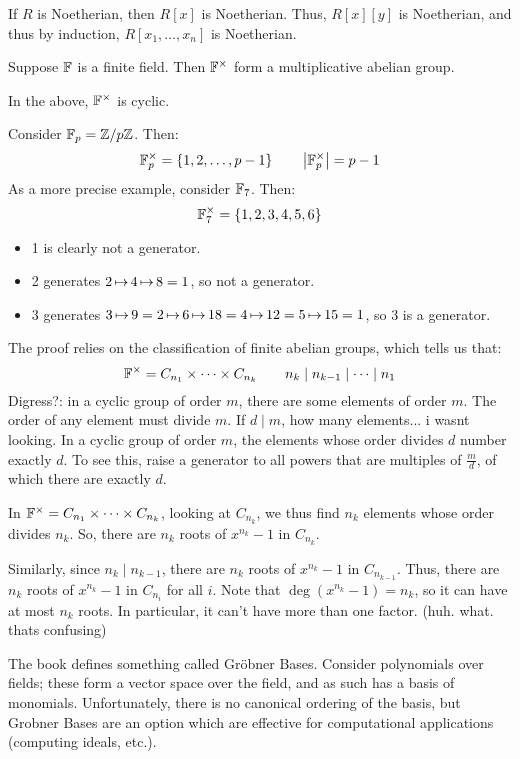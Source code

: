 If $ R $ is Noetherian, then $ R[x] $ is Noetherian.
Thus, $ R[x][y] $ is Noetherian, and thus by induction, $ R[x_{1},\dots,x_{n}] $ is Noetherian.

Suppose $ \mathbb{F} $ is a finite field. Then $ \mathbb{F}^{\times} $ form a multiplicative abelian group.
\begin{thm}
    In the above, $ \mathbb{F}^{\times} $ is cyclic.
\end{thm}

\begin{xmp}[source=Primary Source Material]
    Consider $ \mathbb{F}_{p} = \mathbb{Z}/p\mathbb{Z} $. Then:
    \begin{equation*}
        \mathbb{F}_{p}^{\times} = \left\{{1, 2, \dots, p-1}\right\} \qquad \abs{\mathbb{F}_{p}^{\times}} = p-1
    \end{equation*}
    As a more precise example, consider $ \mathbb{F}_{7} $. Then:
    \begin{equation*}
        \mathbb{F}_{7}^{\times} = \left\{{1, 2, 3, 4, 5, 6}\right\}
    \end{equation*}
    \begin{itemize}
        \item 1 is clearly not a generator.
        \item 2 generates $ 2 \operatorname{\mapsto} 4 \operatorname{\mapsto} 8 = 1 $, so not a generator.
        \item 3 generates $ 3 \operatorname{\mapsto} 9 = 2 \operatorname{\mapsto} 6 \operatorname{\mapsto} 18 = 4 \operatorname{\mapsto} 12 = 5 \operatorname{\mapsto} 15 = 1 $, so 3 is a
            generator.
    \end{itemize}
\end{xmp}
The proof relies on the classification of finite abelian groups, which tells us that:
\begin{equation*}
    \mathbb{F}^{\times} = C_{n_{1}} \times \cdots \times C_{n_{k}} \qquad
    n_{k} \mid n_{k-1} \mid \cdots \mid n_{1}
\end{equation*}
Digress?: in a cyclic group of order $ m $, there are some elements of order $ m $.
The order of any element must divide $ m $. If $ d \mid m $, how many elements... i wasnt looking.
In a cyclic group of order $ m $, the elements whose order divides $ d $ number exactly $ d $.
To see this, raise a generator to all powers that are multiples of $ \frac{m}{d} $, of which there
are exactly $ d $.

In $ \mathbb{F}^{\times} = C_{n_{1}} \times \cdots \times C_{n_{k}} $, looking at $ C_{n_{k}} $, we
thus find $ n_{k} $ elements whose order divides $ n_{k} $.
So, there are $ n_{k} $ roots of $ x^{n_{k}} - 1 $ in $ C_{n_{k}} $.

Similarly, since $ n_{k} \mid n_{k-1} $, there are $ n_{k} $ roots of $ x^{n_{k}} - 1 $ in
$ C_{n_{k-1}} $. Thus, there are $ n_{k} $ roots of $ x^{n_{k}}-1 $ in $ C_{n_{i}} $ for all $ i $.
Note that $ \deg(x^{n_{k}}-1) = n_{k} $, so it can have at most $ n_{k} $ roots.
In particular, it can't have more than one factor. (huh. what. thats confusing)

The book defines something called Gr\"obner Bases.
Consider polynomials over fields; these form a vector space over the field, and as such has a basis
of monomials. Unfortunately, there is no canonical ordering of the basis, but Gr\:obner Bases
are an option which are effective for computational applications (computing ideals, etc.).
